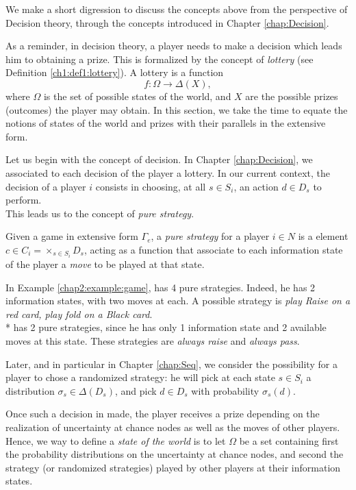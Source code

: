 We make a short digression to discuss the concepts above from the perspective of Decision theory, through the concepts introduced in Chapter \ref{chap:Decision}.

As a reminder, in decision theory, a player needs to make a decision which leads him to obtaining a prize. This is formalized by the concept of \emph{lottery} (see Definition \ref{ch1:def1:lottery}).
A lottery is a function
$$f : \Omega \rightarrow \Delta(X), $$
where $\Omega$ is the set of possible states of the world, and $X$ are the possible prizes (outcomes) the player may obtain. In this section, we take the time to equate the notions of states of the world and prizes with their parallels in the extensive form.

Let us begin with the concept of decision. In Chapter \ref{chap:Decision}, we associated to each decision of the player a lottery.
 In our current context, the decision of a player $i$ consists in choosing, at all $s \in S_i$, an action $d \in D_s$ to perform.\\
 This leads us to the concept of \emph{pure strategy}. \\
 \begin{definition} 
Given a game in extensive form $\Gamma_e$, a \emph{pure strategy} for a player $i \in N$ is a element
$c \in C_i = \times_{s \in S_i} D_s$, acting as a function that associate to each information  state of the player a \emph{move} to be played at that state.
\end{definition}
\begin{example}
In Example \ref{chap2:example:game},
\TAtwo{} has 4 pure strategies. Indeed, he has 2 information states,
with two moves at each. A possible strategy is
\emph{play Raise on a red card, play fold on a Black card}.\\*
\TAone{} has 2 pure strategies, since he has only 1 information state and 2 available moves at this state.
These strategies are \emph{always raise} and \emph{always pass}.
\end{example}
 Later, and in particular in Chapter \ref{chap:Seq}, we consider the possibility for a player to chose a randomized strategy: he will pick at each state $s \in S_i$ a distribution $\sigma_s \in \Delta(D_s)$, and pick $d \in D_s$ with probability $\sigma_s(d)$.

Once such a decision in made, the player receives a prize depending on the realization of uncertainty at chance nodes as well as the moves of other players. Hence, we way to define a \emph{state of the world} is to
let $\Omega$ be a set containing first the probability distributions on the uncertainty at chance nodes, and second the strategy (or randomized strategies) played by other players at their information states.

